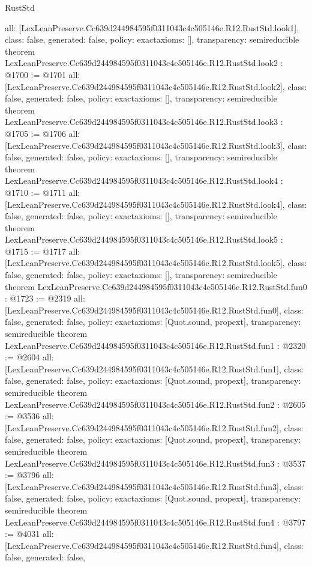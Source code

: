 \begin{lexlean}{RustStd}
\begin{coremodule}
{  all: [LexLeanPreserve.Cc639d244984595f0311043c4c505146e.R12.RustStd.look1],
  class: false,
  generated: false,
  policy: exact{axioms: []},
  transparency: semireducible
}
theorem LexLeanPreserve.Cc639d244984595f0311043c4c505146e.R12.RustStd.look2 : @1700 := @1701 {
  all: [LexLeanPreserve.Cc639d244984595f0311043c4c505146e.R12.RustStd.look2],
  class: false,
  generated: false,
  policy: exact{axioms: []},
  transparency: semireducible
}
theorem LexLeanPreserve.Cc639d244984595f0311043c4c505146e.R12.RustStd.look3 : @1705 := @1706 {
  all: [LexLeanPreserve.Cc639d244984595f0311043c4c505146e.R12.RustStd.look3],
  class: false,
  generated: false,
  policy: exact{axioms: []},
  transparency: semireducible
}
theorem LexLeanPreserve.Cc639d244984595f0311043c4c505146e.R12.RustStd.look4 : @1710 := @1711 {
  all: [LexLeanPreserve.Cc639d244984595f0311043c4c505146e.R12.RustStd.look4],
  class: false,
  generated: false,
  policy: exact{axioms: []},
  transparency: semireducible
}
theorem LexLeanPreserve.Cc639d244984595f0311043c4c505146e.R12.RustStd.look5 : @1715 := @1717 {
  all: [LexLeanPreserve.Cc639d244984595f0311043c4c505146e.R12.RustStd.look5],
  class: false,
  generated: false,
  policy: exact{axioms: []},
  transparency: semireducible
}
theorem LexLeanPreserve.Cc639d244984595f0311043c4c505146e.R12.RustStd.fun0 : @1723 := @2319 {
  all: [LexLeanPreserve.Cc639d244984595f0311043c4c505146e.R12.RustStd.fun0],
  class: false,
  generated: false,
  policy: exact{axioms: [Quot.sound, propext]},
  transparency: semireducible
}
theorem LexLeanPreserve.Cc639d244984595f0311043c4c505146e.R12.RustStd.fun1 : @2320 := @2604 {
  all: [LexLeanPreserve.Cc639d244984595f0311043c4c505146e.R12.RustStd.fun1],
  class: false,
  generated: false,
  policy: exact{axioms: [Quot.sound, propext]},
  transparency: semireducible
}
theorem LexLeanPreserve.Cc639d244984595f0311043c4c505146e.R12.RustStd.fun2 : @2605 := @3536 {
  all: [LexLeanPreserve.Cc639d244984595f0311043c4c505146e.R12.RustStd.fun2],
  class: false,
  generated: false,
  policy: exact{axioms: [Quot.sound, propext]},
  transparency: semireducible
}
theorem LexLeanPreserve.Cc639d244984595f0311043c4c505146e.R12.RustStd.fun3 : @3537 := @3796 {
  all: [LexLeanPreserve.Cc639d244984595f0311043c4c505146e.R12.RustStd.fun3],
  class: false,
  generated: false,
  policy: exact{axioms: [Quot.sound, propext]},
  transparency: semireducible
}
theorem LexLeanPreserve.Cc639d244984595f0311043c4c505146e.R12.RustStd.fun4 : @3797 := @4031 {
  all: [LexLeanPreserve.Cc639d244984595f0311043c4c505146e.R12.RustStd.fun4],
  class: false,
  generated: false,
}
\end{coremodule}
\end{lexlean}
